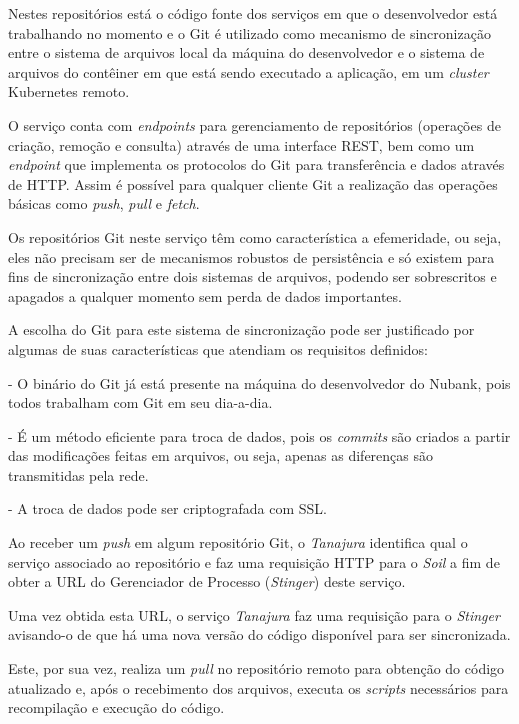 	Nestes repositórios está o código fonte dos serviços em que o desenvolvedor está trabalhando no momento e o Git é utilizado como mecanismo de sincronização entre o sistema de arquivos local da máquina do desenvolvedor e o sistema de arquivos do contêiner em que está sendo executado a aplicação, em um \textit{cluster} Kubernetes remoto.
	
	O serviço conta com \textit{endpoints} para gerenciamento de repositórios (operações de criação, remoção e consulta) através de uma interface REST, bem como um \textit{endpoint} que implementa os protocolos do Git para transferência e dados através de HTTP. Assim é possível para qualquer cliente Git a realização das operações básicas como \textit{push}, \textit{pull} e \textit{fetch}.
	
	Os repositórios Git neste serviço têm como característica a efemeridade, ou seja, eles não precisam ser de mecanismos robustos de persistência e só existem para fins de sincronização entre dois sistemas de arquivos, podendo ser sobrescritos e apagados a qualquer momento sem perda de dados importantes.
	
	A escolha do Git para este sistema de sincronização pode ser justificado por algumas de suas características que atendiam os requisitos definidos:
	
	- O binário do Git já está presente na máquina do desenvolvedor do Nubank, pois todos trabalham com Git em seu dia-a-dia.
	
	- É um método eficiente para troca de dados, pois os \textit{commits} são criados a partir das modificações feitas em arquivos, ou seja, apenas as diferenças são transmitidas pela rede.
	
	- A troca de dados pode ser criptografada com SSL.

	Ao receber um \textit{push} em algum repositório Git, o \textit{Tanajura} identifica qual o serviço associado ao repositório e faz uma requisição HTTP para o \textit{Soil} a fim de obter a URL do Gerenciador de Processo (\textit{Stinger}) deste serviço.
	
	Uma vez obtida esta URL, o serviço \textit{Tanajura} faz uma requisição para o \textit{Stinger} avisando-o de que há uma nova versão do código disponível para ser sincronizada.
	
	Este, por sua vez, realiza um \textit{pull} no repositório remoto para obtenção do código atualizado e, após o recebimento dos arquivos, executa os \textit{scripts} necessários para recompilação e execução do código.
	
